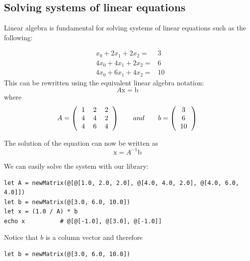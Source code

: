 \documentclass[justified, sixbynine]{tufte-book}
\theoremstyle{plain}%
\newtheorem * {corollary}{Corollary}
\theoremstyle{definition}
\theoremstyle{remark}
\newtheorem * {remark}{Remark}
\newtheorem * {note}{Note}
\begin{document}
\begin{fullwidth}
\goodbreak\subsection{Solving systems of linear equations}


Linear algebra is fundamental for solving systems of linear equations such as the following:

\begin{eqnarray}
&x_0+2x_1+2x_2=&3 \\
&4x_0+4x_1+2x_2=&6 \\
&4x_0+6x_1+4x_2=&10
\end{eqnarray}
This can be rewritten using the equivalent linear algebra notation:
\begin{equation}
A \textrm{x} = \textrm{b}
\end{equation}
where
\begin{equation}
A = \left(\begin{tabular}{ccc}
1 & 2 & 2 \\
4 & 4 & 2 \\
4 & 6 & 4 \\
\end{tabular}\right) \qquad and \qquad
b =
\left(\begin{tabular}{c}
3 \\
6 \\
10 \\
\end{tabular}\right)
\end{equation}

The solution of the equation can now be written as
\begin{equation}
\textrm{x} = A^{-1}\textrm{b}
\end{equation}

We can easily solve the system with our library:

\begin{lstlisting}
let A = newMatrix(@[@[1.0, 2.0, 2.0], @[4.0, 4.0, 2.0], @[4.0, 6.0, 4.0]])
let b = newMatrix(@[3.0, 6.0, 10.0])
let x = (1.0 / A) * b
echo x          # @[@[-1.0], @[3.0], @[-1.0]]
\end{lstlisting}

Notice that $b$ is a column vector and therefore

\begin{lstlisting}
let b = newMatrix(@[3.0, 6.0, 10.0])
\end{lstlisting}


\end{fullwidth}
\end{document}

